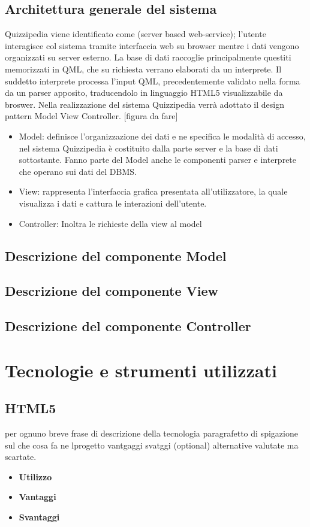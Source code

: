\documentclass[a4paper,11pt]{article}
\begin{document}
	\subsection{Architettura generale del sistema}
	Quizzipedia viene identificato come (server based web-service); l'utente interagisce col sistema tramite interfaccia web su browser mentre i dati vengono organizzati su server esterno. La base di dati raccoglie principalmente questiti memorizzati in QML, che su richiesta verrano elaborati da un interprete.
Il suddetto interprete processa l'input QML, precedentemente validato nella forma da un parser apposito, traducendolo in linguaggio HTML5 visualizzabile da broswer.
Nella realizzazione del sistema Quizzipedia verrà adottato il design pattern Model View Controller.
[figura da fare]
\begin {itemize}
\item Model: definisce l'organizzazione dei dati e ne specifica le modalità di accesso, nel sistema Quizzipedia è costituito dalla parte server e la base di dati sottostante. Fanno parte del Model anche le componenti parser e interprete che operano sui dati del DBMS.
\item View: rappresenta l'interfaccia grafica presentata all'utilizzatore, la quale visualizza i dati e cattura le interazioni dell'utente.
\item Controller: Inoltra le richieste della view al model
	\end {itemize}
	\subsection{Descrizione del componente Model}
	\subsection{Descrizione del componente View}	
	\subsection{Descrizione del componente Controller}
	\section{Tecnologie e strumenti utilizzati}
	\subsection{HTML5}
	per ognuno
	breve frase di descrizione della tecnologia
	paragrafetto di spigazione sul che cosa fa ne lprogetto
	vantgaggi
	svatggi
	(optional) alternative valutate ma scartate.
	\begin{itemize}
		\item\textbf{Utilizzo}
		\item\textbf{Vantaggi}
		\item\textbf{Svantaggi}
	\end{itemize}
\end{document}

